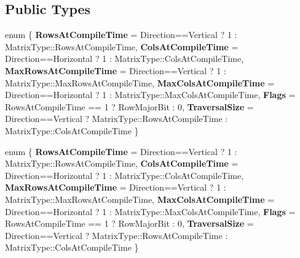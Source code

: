 \subsection*{Public Types}
\begin{DoxyCompactItemize}
\item 
\mbox{\label{struct_eigen_1_1internal_1_1traits_3_01_partial_redux_expr_3_01_matrix_type_00_01_member_op_00_01_direction_01_4_01_4_a175ab3719bd9223332e6b4c320c21be2}} 
enum \{ \newline
{\bfseries Rows\+At\+Compile\+Time} = Direction==Vertical ? 1 \+: Matrix\+Type\+:\+:Rows\+At\+Compile\+Time, 
{\bfseries Cols\+At\+Compile\+Time} = Direction==Horizontal ? 1 \+: Matrix\+Type\+:\+:Cols\+At\+Compile\+Time, 
{\bfseries Max\+Rows\+At\+Compile\+Time} = Direction==Vertical ? 1 \+: Matrix\+Type\+:\+:Max\+Rows\+At\+Compile\+Time, 
{\bfseries Max\+Cols\+At\+Compile\+Time} = Direction==Horizontal ? 1 \+: Matrix\+Type\+:\+:Max\+Cols\+At\+Compile\+Time, 
\newline
{\bfseries Flags} = Rows\+At\+Compile\+Time == 1 ? Row\+Major\+Bit \+: 0, 
{\bfseries Traversal\+Size} = Direction==Vertical ? Matrix\+Type\+:\+:Rows\+At\+Compile\+Time \+: Matrix\+Type\+:\+:Cols\+At\+Compile\+Time
 \}
\item 
\mbox{\label{struct_eigen_1_1internal_1_1traits_3_01_partial_redux_expr_3_01_matrix_type_00_01_member_op_00_01_direction_01_4_01_4_a749bc1d5fd44dce69bb06770a48da8c1}} 
enum \{ \newline
{\bfseries Rows\+At\+Compile\+Time} = Direction==Vertical ? 1 \+: Matrix\+Type\+:\+:Rows\+At\+Compile\+Time, 
{\bfseries Cols\+At\+Compile\+Time} = Direction==Horizontal ? 1 \+: Matrix\+Type\+:\+:Cols\+At\+Compile\+Time, 
{\bfseries Max\+Rows\+At\+Compile\+Time} = Direction==Vertical ? 1 \+: Matrix\+Type\+:\+:Max\+Rows\+At\+Compile\+Time, 
{\bfseries Max\+Cols\+At\+Compile\+Time} = Direction==Horizontal ? 1 \+: Matrix\+Type\+:\+:Max\+Cols\+At\+Compile\+Time, 
\newline
{\bfseries Flags} = Rows\+At\+Compile\+Time == 1 ? Row\+Major\+Bit \+: 0, 
{\bfseries Traversal\+Size} = Direction==Vertical ? Matrix\+Type\+:\+:Rows\+At\+Compile\+Time \+: Matrix\+Type\+:\+:Cols\+At\+Compile\+Time
 \}
\item 

\end{DoxyCompactItemize}

